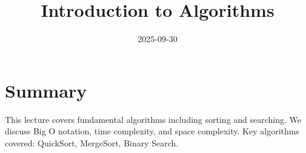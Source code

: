 \documentclass[11pt]{article}
\begin{document}
\title{Introduction to Algorithms}
\date{2025-09-30}
\maketitle

\section{Summary}
This lecture covers fundamental algorithms including sorting and searching. We discuss Big O notation, time complexity, and space complexity. Key algorithms covered: QuickSort, MergeSort, Binary Search.
\end{document}
